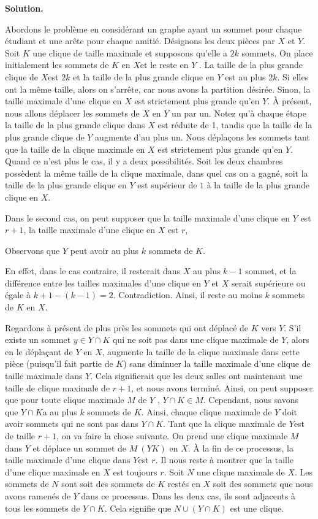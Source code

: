 \begin{sol}
{\bf Solution.}

Abordons le problème en considérant un graphe ayant un sommet pour chaque étudiant et une arête pour chaque amitié. Désignons les deux pièces par $X$ et $Y$. Soit $K$ une clique de taille maximale et supposons qu'elle a $2k$ sommets. On place initialement les sommets de $K$ en $ X$et le reste en $Y$ . La taille de la plus grande clique de $X $est $2k$ et la taille de la plus grande clique en $Y$ est au plus $2k$. Si elles ont la même taille, alors on s’arrête, car nous avons la partition désirée. Sinon, la taille maximale d’une clique en $X$ est strictement plus grande qu’en $Y$. À présent, nous allons déplacer les sommets de $X$ en $Y$ un par un. Notez qu'à chaque étape la taille de la plus grande clique dans $X $ est réduite de 1, tandis que la taille de la plus grande clique de $Y$ augmente d'au plus un. Nous déplaçons les sommets tant que la taille de la clique maximale en $X$ est strictement plus grande qu’en $Y $. Quand ce n'est plus le cas, il y a deux possibilités. Soit les deux chambres possèdent la même taille de la clique maximale, dans quel cas on a gagné, soit la taille de la plus grande clique en $Y$ est supérieur de $1$ à la taille de la plus grande clique en $X$. 

Dans le second cas, on peut supposer que la taille maximale d’une clique en $Y$ est $r + 1$, la taille maximale d’une clique en $X$ est $r $,

Observons que $Y$ peut avoir au plus $k$ sommets de $K$. 

En effet, dans le cas contraire, il resterait dans $X$ au plus $k-1$ sommet, et la différence entre les tailles maximales d’une clique en $Y$ et $X$ serait supérieure ou égale à $k+1-(k-1)=2$. Contradiction. Ainsi, il reste au moins $k$ sommets de $K$ en $X$.

Regardons à présent de plus près les sommets qui ont déplacé de $K$ vers $Y$. S'il existe un sommet $y \in Y \cap K$ qui ne soit pas dans une clique maximale de $Y$, alors en le déplaçant de $ Y$ en $X$, augmente la taille de la clique maximale dans cette pièce (puisqu'il fait partie de $K$) sans diminuer la taille maximale d'une clique de taille maximale dans $Y $. Cela signifierait
que les deux salles ont maintenant une taille de clique maximale de $r + 1$, et nous avons terminé.
Ainsi, on peut supposer que pour toute clique maximale $M$ de $Y$ , $Y \cap K \in M$. Cependant, nous savons que
$Y \cap K $a au plus $ k$ sommets de $K$. Ainsi, chaque clique maximale de $Y$ doit avoir sommets qui ne sont pas dans $Y \cap K$. Tant que la clique maximale de $Y $est de taille $r+1$, on va faire la chose suivante. On prend une clique maximale $M$ dans $Y$ et déplace un sommet de $M\ (Y K)$ en $X$. À la fin de ce processus, la taille maximale d'une clique dans $Y $est $r$. Il nous reste à montrer que la taille d’une clique maximale en $X$ est toujours $r$. Soit $N $ une clique maximale de $X$. Les sommets de $N$ sont soit des sommets de $K$ restés en 
$X$ soit des sommets que nous avons ramenés de $Y$ dans ce processus. Dans les deux cas, ils sont adjacents à
tous les sommets de $Y \cap K.$ Cela signifie que $N \cup (Y \cap K) $ est une clique. 


\end{sol}
